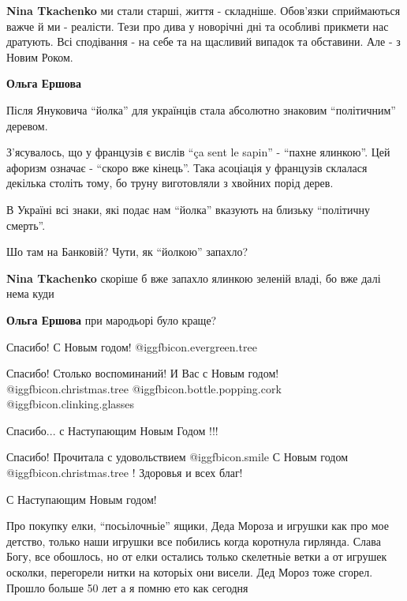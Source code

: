\begin{itemize}
\begin{itemize} %
\textbf{Nina Tkachenko} ми стали старші, життя - складніше. Обов'язки сприймаються важче й ми - реалісти. Тези про дива у новорічні дні та особливі прикмети нас дратують. Всі сподівання - на себе та на щасливий випадок та обставини.
Але - з Новим Роком.

\begin{itemize} %
\textbf{Ольга Ершова} 

Після Януковича \enquote{йолка} для українців стала абсолютно знаковим \enquote{політичним}
деревом.

З'ясувалось, що у французів є вислів \enquote{ça sent le sapin} - \enquote{пахне ялинкою}. Цей
афоризм означає - \enquote{скоро вже кінець}. Така асоціація у французів склалася
декілька століть тому, бо труну виготовляли з хвойних порід дерев.

В Україні всі знаки, які подає нам \enquote{йолка} вказують на близьку \enquote{політичну
смерть}.

Шо там на Банковій? Чути, як \enquote{йолкою} запахло?

\textbf{Nina Tkachenko} скоріше б вже запахло ялинкою зеленій владі, бо вже далі нема куди

\textbf{Ольга Ершова} при мародьорі було краще?
\end{itemize} %

\end{itemize} %

Спасибо! С Новым годом!  @igg{fbicon.evergreen.tree} 

Спасибо! Столько воспоминаний! И Вас с Новым годом! @igg{fbicon.christmas.tree}  @igg{fbicon.bottle.popping.cork}  @igg{fbicon.clinking.glasses} 

Спасибо... с Наступающим Новым Годом !!!

Спасибо! Прочитала с удовольствием  @igg{fbicon.smile} 
С Новым годом  @igg{fbicon.christmas.tree} ! Здоровья и всех благ!

С Наступающим Новым годом!


Про покупку елки, \enquote{посьілочньіе} ящики, Деда Мороза и игрушки как про мое
детство, только наши игрушки все побились когда коротнула гирлянда. Слава Богу,
все обошлось, но от елки остались только скелетньіе ветки а от игрушек осколки,
перегорели нитки на которьіх они висели. Дед Мороз тоже сгорел. Прошло больше 50
лет а я помню ето как сегодня


\end{itemize}
